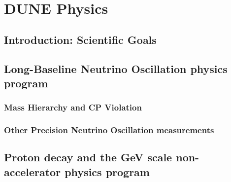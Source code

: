 \chapter{DUNE Physics}
\label{ch:exec-summ-physics}



\section{Introduction: Scientific Goals}
\label{sec:exec-summ-physics-goals}


\section{Long-Baseline Neutrino Oscillation physics program}
\label{sec:exec-summ-physics-osc}


\subsection{Mass Hierarchy and CP Violation}
\label{sec:exec-summ-physics-mh-cpv}


\subsection{Other Precision Neutrino Oscillation measurements}
\label{sec:exec-summ-physics-other}



\section{Proton decay and the GeV scale non-accelerator physics program}
\label{sec:exec-summ-physics-pdk}

